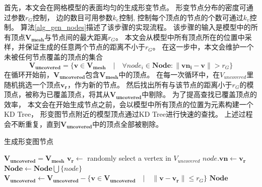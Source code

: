 首先，本文会在网格模型的表面均匀的生成形变节点。
形变节点分布的密度可通过参数$r_G$控制，
边的数目可用参数$k_e$控制,
控制每个顶点的节点的个数可通过$k_v$控制。
算法\ref{alg_gen_nodes}描述了该步骤的实现流程。
该步骤的输入是模型中的所有顶点$\bm{V_{mesh}}$与节点间的最大距离$r_G$。
本文会从模型中所有顶点所在的位置中采样，并保证生成的任意两个节点的距离不小于$r_G$。
在这一步中，本文会维护一个未被任何节点覆盖的顶点的集合
\begin{equation}
    \bm{V_{uncovered}}  = \{\bm{v} \in \bm{V_{mesh}} \quad |
    \quad \forall node_i \in \bm{Node}: \| \bm{vn_i} - \bm{v}\| > r_G\}
\end{equation}
在循环开始前，$\bm{V_{uncovered}}$包含$\bm{V_{mesh}}$中的顶点。
在每一次循环中，在$V_{uncovered}$里随机挑选一个顶点$\bm{v_r}$，作为新的节点。
然后找出所有与该节点的距离小于$r_G$的模顶点，被称为已覆盖顶点，将其从$\bm{V_{uncovered}}$中剔除。
为了提高查找已覆盖顶点的效率，
本文会在开始生成节点之前，会以模型中所有顶点的位置为元素构建一个KD Tree，
形变图节点附近的模型顶点通过KD Tree进行快速的查找。
上述过程会不断重复，直到$\bm{V_{uncovered}}$中的顶点全部被剔除。
\begin{algorithm} 
    \caption{生成形变图节点}
    \label{alg_gen_nodes}
    \begin{algorithmic}[1]
        \State $\bm{V_{uncovered}} = \bm{V_{mesh}}$
            \State $\bm{v_r} \gets$ randomly select a vertex in $V_{uncovered}$
            \State $node.\bm{vn} \gets \bm{v_r}$
            \State $\bm{Node} \gets \bm{Node} \bigcup \{node\}$
            \State $\bm{V_{uncovered}} \gets \bm{V_{uncovered}} - 
                    \{\bm{v} \in \bm{V_{uncovered}} \quad | \quad 
                    \|\bm{v} - \bm{v_r}\| \leq r_G\}$
        \EndWhile
        \State \Return $\bm{Node}$
    \EndFunction
    \end{algorithmic}
\end{algorithm} 

